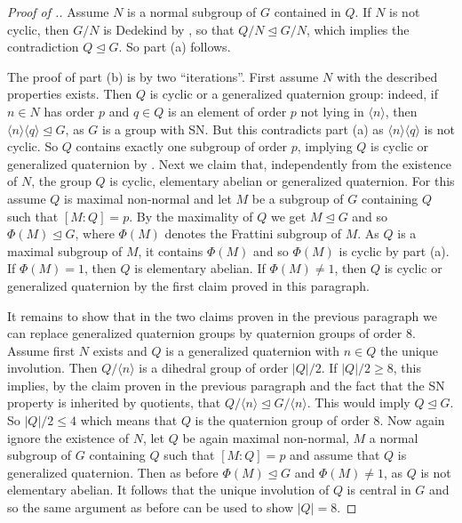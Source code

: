 \documentclass[a4paper,10pt]{amsart}
\theoremstyle{definition}
\theoremstyle{remark}
\begin{document}
\begin{proof}[Proof of .]
Assume $N$ is a normal subgroup of $G$ contained in $Q$. If $N$ is not cyclic, then $G/N$ is Dedekind by , so that $Q/N \unlhd G/N$, which implies the contradiction $Q \unlhd G$. So part (a) follows.

The proof of part (b) is by two ``iterations''. First assume $N$ with the described properties exists. Then $Q$ is cyclic or a generalized quaternion group: indeed, if $n \in N$ has order $p$ and $q \in Q$ is an element of order $p$ not lying in $\langle n \rangle$, then $\langle n \rangle \langle q \rangle \unlhd G$, as $G$ is a group with SN. But this contradicts part (a) as $\langle n \rangle \langle q \rangle$ is not cyclic. So $Q$ contains exactly one subgroup of order $p$, implying $Q$ is cyclic or generalized quaternion by . Next we claim that, independently from the existence of $N$, the group $Q$ is cyclic, elementary abelian or generalized quaternion. For this assume $Q$ is maximal non-normal and let $M$ be a subgroup of $G$ containing $Q$ such that $[M:Q] = p$. By the maximality of $Q$ we get $M \unlhd G$ and so $\Phi(M) \unlhd G$, where $\Phi(M)$ denotes the Frattini subgroup of $M$. As $Q$ is a maximal subgroup of $M$, it contains $\Phi(M)$ and so $\Phi(M)$ is cyclic by part (a). If $\Phi(M) = 1$, then $Q$ is elementary abelian. If $\Phi(M) \neq 1$, then $Q$ is cyclic or generalized quaternion by the first claim proved in this paragraph.

It remains to show that in the two claims proven in the previous paragraph we can replace generalized quaternion groups by quaternion groups of order $8$. Assume first $N$ exists and $Q$ is a generalized quaternion with $n \in Q$ the unique involution. Then $Q/\langle n \rangle$ is a dihedral group of order $|Q|/2$. If $|Q|/2 \geq 8$, this implies, by the claim proven in the previous paragraph and the fact that the SN property is inherited by quotients, that $Q/\langle n \rangle \unlhd G/\langle n \rangle$. This would imply $Q \unlhd G$. So $|Q|/2 \leq 4$ which means that $Q$ is the quaternion group of order $8$. Now again ignore the existence of $N$, let $Q$ be again maximal non-normal, $M$ a normal subgroup of $G$ containing $Q$ such that $[M:Q] = p$ and assume that $Q$ is generalized quaternion. Then as before $\Phi(M) \unlhd G$ and $\Phi(M) \neq 1$, as $Q$ is not elementary abelian. It follows that the unique involution of $Q$ is central in $G$ and so the same argument as before can be used to show $|Q| = 8$.
\end{proof}
\end{document}
